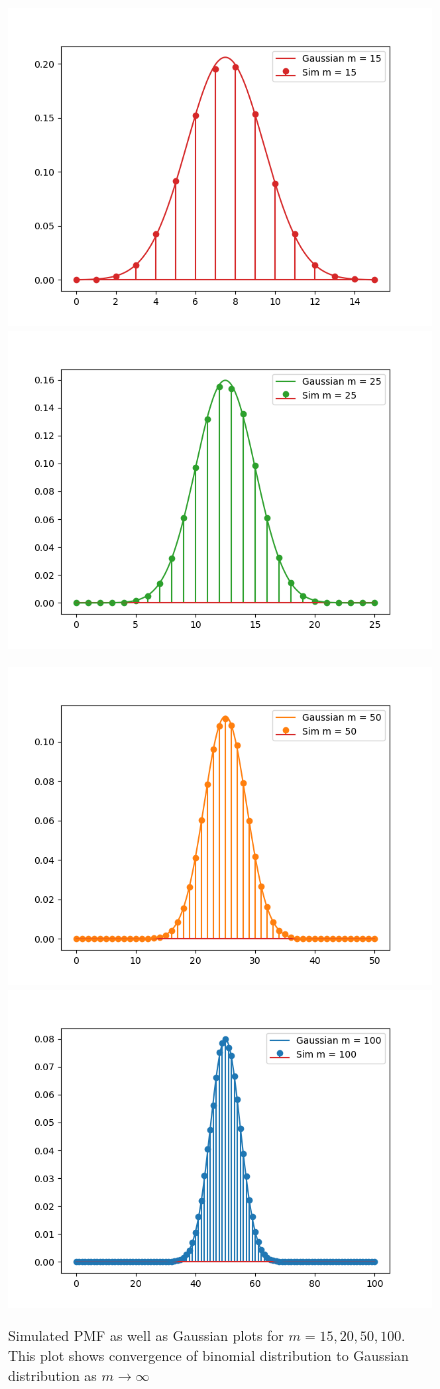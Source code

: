 \documentclass{beamer}
\theoremstyle{remark}
\numberwithin{equation}{section}
\begin{document}
\begin{frame}
\begin{figure}[h!]
    {\includegraphics[width=0.4\columnwidth]{./figs/gauss_0.png}}
    \hspace{\fill}
    {\includegraphics[width=0.4\columnwidth]{./figs/gauss_1.png}}
\end{figure}
\begin{figure}[h!]
    {\includegraphics[width=0.4\columnwidth]{./figs/gauss_2.png}}
    \hspace{\fill}
    {\includegraphics[width=0.4\columnwidth]{./figs/gauss_3.png}}
    \caption{Simulated PMF as well as Gaussian plots for $m = 15, 20, 50, 100$. This plot shows convergence of binomial distribution to Gaussian distribution as $m \to \infty$}
\end{figure}
\end{frame}
\end{document}
